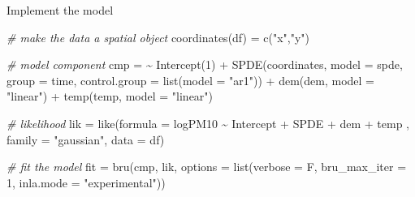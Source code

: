 \documentclass[
  ignorenonframetext,
]{beamer}
\newenvironment{Shaded}{\begin{snugshade}}{\end{snugshade}}
\newcommand{\AttributeTok}[1]{\textcolor[rgb]{0.77,0.63,0.00}{#1}}
\newcommand{\CommentTok}[1]{\textcolor[rgb]{0.56,0.35,0.01}{\textit{#1}}}
\newcommand{\DecValTok}[1]{\textcolor[rgb]{0.00,0.00,0.81}{#1}}
\newcommand{\ErrorTok}[1]{\textcolor[rgb]{0.64,0.00,0.00}{\textbf{#1}}}
\newcommand{\FunctionTok}[1]{\textcolor[rgb]{0.00,0.00,0.00}{#1}}
\newcommand{\NormalTok}[1]{#1}
\newcommand{\OtherTok}[1]{\textcolor[rgb]{0.56,0.35,0.01}{#1}}
\newcommand{\SpecialCharTok}[1]{\textcolor[rgb]{0.00,0.00,0.00}{#1}}
\newcommand{\StringTok}[1]{\textcolor[rgb]{0.31,0.60,0.02}{#1}}
\begin{document}
\begin{frame}[fragile]{Implement the model}
\protect\hypertarget{implement-the-model}{}
\tiny

\begin{Shaded}
\begin{Highlighting}[]
\CommentTok{\# make the data a spatial object}
\FunctionTok{coordinates}\NormalTok{(df) }\OtherTok{=} \FunctionTok{c}\NormalTok{(}\StringTok{"x"}\NormalTok{,}\StringTok{"y"}\NormalTok{)}

\CommentTok{\# model component}
\NormalTok{cmp  }\OtherTok{=} \ErrorTok{\textasciitilde{}} \FunctionTok{Intercept}\NormalTok{(}\DecValTok{1}\NormalTok{) }\SpecialCharTok{+} 
  \FunctionTok{SPDE}\NormalTok{(coordinates, }\AttributeTok{model =}\NormalTok{ spde,}
       \AttributeTok{group =}\NormalTok{ time, }\AttributeTok{control.group =} \FunctionTok{list}\NormalTok{(}\AttributeTok{model =} \StringTok{"ar1"}\NormalTok{)) }\SpecialCharTok{+}
  \FunctionTok{dem}\NormalTok{(dem, }\AttributeTok{model =} \StringTok{"linear"}\NormalTok{) }\SpecialCharTok{+} 
  \FunctionTok{temp}\NormalTok{(temp, }\AttributeTok{model =} \StringTok{"linear"}\NormalTok{)}

\CommentTok{\# likelihood}
\NormalTok{lik }\OtherTok{=} \FunctionTok{like}\NormalTok{(}\AttributeTok{formula =}\NormalTok{ logPM10 }\SpecialCharTok{\textasciitilde{}}\NormalTok{ Intercept }\SpecialCharTok{+}\NormalTok{ SPDE }\SpecialCharTok{+}\NormalTok{ dem }\SpecialCharTok{+}\NormalTok{ temp ,}
           \AttributeTok{family =} \StringTok{"gaussian"}\NormalTok{,}
           \AttributeTok{data =}\NormalTok{ df)}

\CommentTok{\# fit the model}
\NormalTok{fit }\OtherTok{=} \FunctionTok{bru}\NormalTok{(cmp, lik,}
          \AttributeTok{options =} \FunctionTok{list}\NormalTok{(}\AttributeTok{verbose =}\NormalTok{ F,}
                         \AttributeTok{bru\_max\_iter =} \DecValTok{1}\NormalTok{,}
                         \AttributeTok{inla.mode  =} \StringTok{"experimental"}\NormalTok{))}
\end{Highlighting}
\end{Shaded}
\end{frame}
\end{document}
